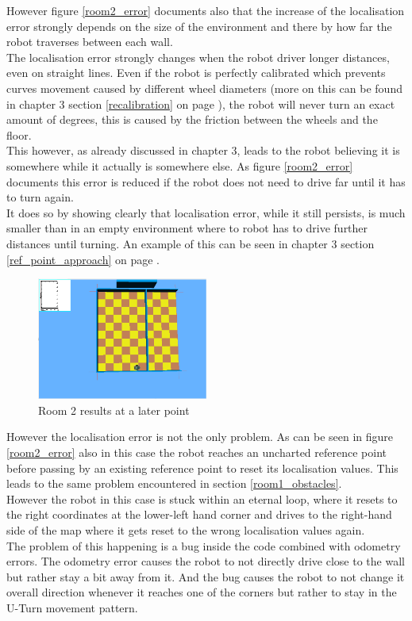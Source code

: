 However figure \ref{room2_error} documents also that the increase of the localisation error strongly depends on the size of the environment and there by how far the robot traverses between each wall. \\
The localisation error strongly changes when the robot driver longer distances, even on straight lines. Even if the robot is perfectly calibrated which prevents curves movement caused by different wheel diameters (more on this can be found in chapter 3 section \ref{recalibration} on page \pageref{recalibration}), the robot will never turn an exact amount of degrees, this is caused by the friction between the wheels and the floor. \\
This however, as already discussed in chapter 3, leads to the robot believing it is somewhere while it actually is somewhere else.  As figure \ref{room2_error} documents this error is reduced if the robot does not need to drive far until it has to turn again.\\
It does so by showing clearly that localisation error, while it still persists, is much smaller than in an empty environment where to robot has to drive further distances until turning. An example of this can be seen in chapter 3 section \ref{ref_point_approach} on page \pageref{ref_point_approach}. \\[3ex]

\begin{figure}[h]
\centering
\includegraphics[width = 0.5\textwidth]{../../figures/map_results/save_corner_with_odometry_error_later.png}
\caption{Room 2 results at a later point}
\label{room2_results_later}
\end{figure}

However the localisation error is not the only problem. As can be seen in figure \ref{room2_error} also in this case the robot reaches an uncharted reference point before passing by an existing reference point to reset its localisation values. This leads to the same problem encountered in section \ref{room1_obstacles}. \\
However the robot in this case is stuck within an eternal loop, where it resets to the right coordinates at the lower-left hand corner and drives to the right-hand side of the map where it gets reset to the wrong localisation values again. \\
The problem of this happening is a bug inside the code combined with odometry errors. The odometry error causes the robot to not directly drive close to the wall but rather stay a bit away from it. And the bug causes the robot to not change it overall direction whenever it reaches one of the corners but rather to stay in the U-Turn movement pattern.

